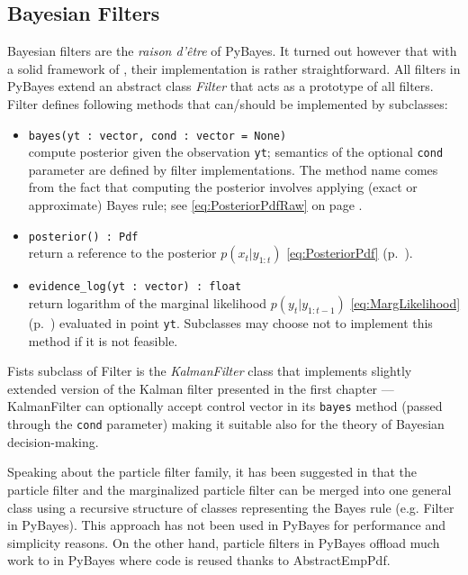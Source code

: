 \subsection{Bayesian Filters}

Bayesian filters are the \emph{raison d'être} of PyBayes. It turned out however that with a solid
framework of {\pdfs}, their implementation is rather straightforward. All filters in PyBayes extend
an abstract class \emph{Filter} that acts as a prototype of all filters. Filter defines following
methods that can/should be implemented by subclasses:
\begin{itemize}
	\item \verb|bayes(yt : vector, cond : vector = None)| \\
		compute posterior {\pdf} given
		the observation \verb|yt|; semantics of the optional \verb|cond| parameter are defined
		by filter implementations. The method name comes from the fact that computing the posterior
		{\pdf} involves applying (exact or approximate) Bayes rule; see \eqref{eq:PosteriorPdfRaw}
		on page \pageref{eq:PosteriorPdfRaw}.
	\item \verb|posterior() : Pdf| \\
		return a reference to the posterior {\pdf} \(p(x_t | y_{1:t})\) \eqref{eq:PosteriorPdf}
		(p.~\pageref{eq:PosteriorPdf}).
	\item \verb|evidence_log(yt : vector) : float| \\
		return logarithm of the marginal likelihood \(p(y_t | y_{1:t-1})\) \eqref{eq:MargLikelihood}
		(p.~\pageref{eq:MargLikelihood}) evaluated in point \verb|yt|. Subclasses may choose not to
		implement this method if it is not feasible.
\end{itemize}
Fists subclass of Filter is the \emph{KalmanFilter} class that implements slightly extended version
of the Kalman filter presented in the first chapter --- KalmanFilter can optionally accept control
vector in its \verb|bayes| method (passed through the \verb|cond| parameter) making it suitable also
for the theory of Bayesian decision-making.

Speaking about the particle filter family, it has been suggested in \cite{Smi:10} that the particle
filter and the marginalized particle filter can be merged into one general class using a recursive
structure of classes representing the Bayes rule (e.g. Filter in PyBayes). This approach has not
been used in PyBayes for performance and simplicity reasons. On the other hand, particle filters in
PyBayes offload much work to {\pdfs} in PyBayes where code is reused thanks to AbstractEmpPdf.

